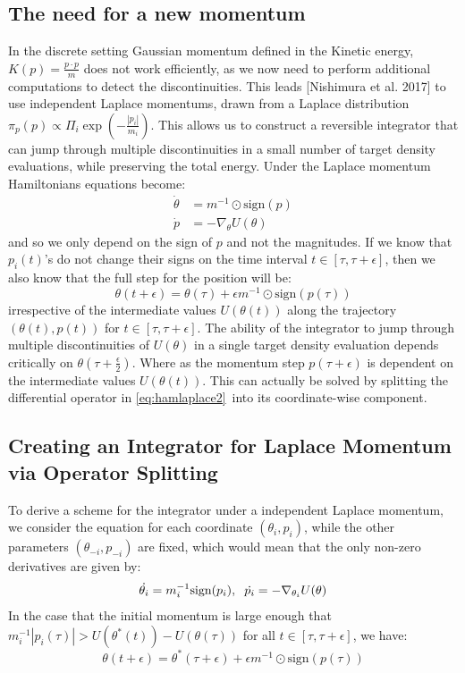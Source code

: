 \documentclass[]{report}
\begin{document}
\subsection{The need for a new momentum}
In the discrete setting Gaussian momentum defined in the Kinetic energy, $K(p) = \frac{p\cdot p}{m}$ does not work efficiently, as we now need to perform additional computations to detect the discontinuities. This leads [Nishimura et al. 2017] to use independent Laplace momentums, drawn from a Laplace distribution $\pi_{p}(p) \propto \Pi_{i} \exp(-\frac{|p_{i}|}{m_{i}})$. This allows us to construct a reversible integrator that can jump through multiple discontinuities in a small number of target density evaluations, while preserving the total energy. 
Under the Laplace momentum Hamiltonians equations become: \begin{align}
\label{eq:hamlaplace1}
\dot{\theta} &= m^{-1} \odot \text{sign}(p)\\
\label{eq:hamlaplace2}
\dot{p} &= -\nabla_{\theta} U(\theta)
\end{align}
and so we only depend on the sign of $p$ and not the magnitudes. If we know that $p_{i}(t)$'s do not change their signs on the time interval $t \in [\tau, \tau + \epsilon]$, then we also know that the full step for the position will be:\begin{equation}
\theta(t + \epsilon) = \theta(\tau) + \epsilon m^{-1} \odot \text{sign}(p(\tau))
\end{equation} irrespective of the intermediate values $U(\theta(t))$ along the trajectory $(\theta(t),p(t))$ for $t \in [\tau, \tau + \epsilon]$. The ability of the integrator to jump through multiple discontinuities of $U(\theta)$ in a single target density evaluation depends critically on $\theta(\tau + \frac{\epsilon}{2})$. Where as the momentum step $p(\tau + \epsilon)$ is dependent on the intermediate values $U(\theta(t))$. This can actually be solved by splitting the differential operator in \ref{eq:hamlaplace2}\, into its coordinate-wise component. 
\subsection{Creating an Integrator for Laplace Momentum via Operator Splitting}

To derive a scheme for the integrator under a independent Laplace momentum, we consider the equation for each coordinate $(\theta_{i}, p_{i})$, while the other parameters $(\theta_{-i},p_{-i})$ are fixed, which would mean that the only non-zero derivatives are given by:\begin{equation}
	\dot{\theta_{i}} = m^{-1}_{i} \text{sign}(p_{i}), \hspace{2mm} \dot{p_{i}} = -\nabla_{\theta_{i}} U(\theta) 
\end{equation}
In the case that the initial momentum is large enough that $m^{-1}_{i}|p_{i}(\tau)| > U(\theta^{*}(t)) - U(\theta(\tau))$ for all $t \in [\tau, \tau + \epsilon]$, we have: \begin{equation}
	\theta(t + \epsilon) = \theta^{*}(\tau + \epsilon) + \epsilon m^{-1} \odot \text{sign}(p(\tau))
\end{equation}
\end{document}

